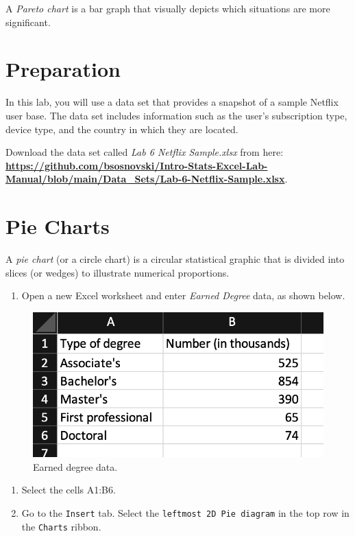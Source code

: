 \documentclass[
]{book}
\providecommand{\tightlist}{%
  \setlength{\itemsep}{0pt}\setlength{\parskip}{0pt}}
\begin{document}
A \emph{Pareto chart} is a bar graph that visually depicts which situations are more significant.

\hypertarget{preparation-3}{%
\section{Preparation}\label{preparation-3}}

In this lab, you will use a data set that provides a snapshot of a sample Netflix user base. The data set includes information such as the user's subscription type, device type, and the country in which they are located.

Download the data set called \emph{Lab 6 Netflix Sample.xlsx} from here: \href{https://github.com/bsosnovski/Intro-Stats-Excel-Lab-Manual/blob/main/Data_Sets/Lab-6-Netflix-Sample.xlsx}{\textbf{https://github.com/bsosnovski/Intro-Stats-Excel-Lab-Manual/blob/main/Data\_Sets/Lab-6-Netflix-Sample.xlsx}}.

\hypertarget{pie-charts}{%
\section{Pie Charts}\label{pie-charts}}

A \emph{pie chart} (or a circle chart) is a circular statistical graphic that is divided into slices (or wedges) to illustrate numerical proportions.

\begin{enumerate}
\def\labelenumi{\arabic{enumi}.}
\tightlist
\item
  Open a new Excel worksheet and enter \emph{Earned Degree} data, as shown below.
\end{enumerate}

\begin{figure}

{\centering \includegraphics[width=0.5\linewidth]{images/degree-earned-data} 

}

\caption{Earned degree data.}\label{fig:degree-earned-data}
\end{figure}

\begin{enumerate}
\def\labelenumi{\arabic{enumi}.}
\setcounter{enumi}{1}
\tightlist
\item
  Select the cells A1:B6.
\item
  Go to the \texttt{Insert} tab. Select the \texttt{leftmost\ 2D\ Pie\ diagram} in the top row in the \texttt{Charts} ribbon.
\end{enumerate}
\end{document}
